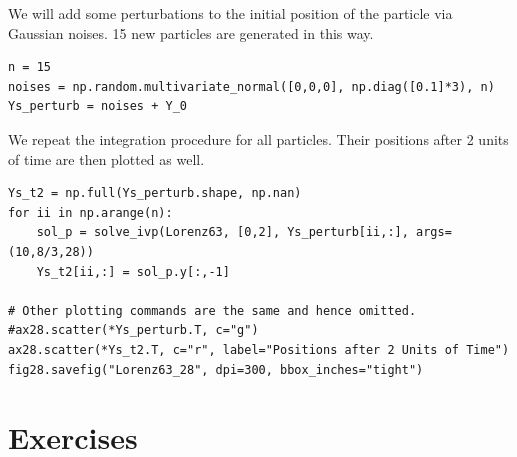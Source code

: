 We will add some perturbations to the initial position of the particle via Gaussian noises. 15 new particles are generated in this way.
\begin{lstlisting}
n = 15
noises = np.random.multivariate_normal([0,0,0], np.diag([0.1]*3), n)
Ys_perturb = noises + Y_0    
\end{lstlisting}
We repeat the integration procedure for all particles. Their positions after 2 units of time are then plotted as well.
\begin{lstlisting}
Ys_t2 = np.full(Ys_perturb.shape, np.nan)
for ii in np.arange(n):
    sol_p = solve_ivp(Lorenz63, [0,2], Ys_perturb[ii,:], args=(10,8/3,28))
    Ys_t2[ii,:] = sol_p.y[:,-1]
    
# Other plotting commands are the same and hence omitted.
#ax28.scatter(*Ys_perturb.T, c="g")
ax28.scatter(*Ys_t2.T, c="r", label="Positions after 2 Units of Time")
fig28.savefig("Lorenz63_28", dpi=300, bbox_inches="tight")
\end{lstlisting}

\section{Exercises}


